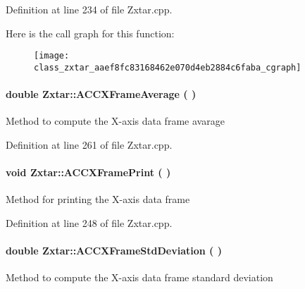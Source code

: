\begin{appendices}
\-Definition at line 234 of file \-Zxtar.\-cpp.



\-Here is the call graph for this function\-:\nopagebreak
\begin{figure}[H]
\begin{center}
\leavevmode
\texttt{[image: class\_zxtar\_aaef8fc83168462e070d4eb2884c6faba\_cgraph]}
\end{center}
\end{figure}


\paragraph[{\-A\-C\-C\-X\-Frame\-Average}]{\setlength{\rightskip}{0pt plus 5cm}double {\bf \-Zxtar\-::\-A\-C\-C\-X\-Frame\-Average} (
)}\label{class_zxtar_a8623ff9e740e0d6068f8b85ba2499a24}
\-Method to compute the \-X-\/axis data frame avarage 

\-Definition at line 261 of file \-Zxtar.\-cpp.

\paragraph[{\-A\-C\-C\-X\-Frame\-Print}]{\setlength{\rightskip}{0pt plus 5cm}void {\bf \-Zxtar\-::\-A\-C\-C\-X\-Frame\-Print} (
)}\label{class_zxtar_ac91d12d80e2b50ca915f83395890a420}
\-Method for printing the \-X-\/axis data frame 

\-Definition at line 248 of file \-Zxtar.\-cpp.

\paragraph[{\-A\-C\-C\-X\-Frame\-Std\-Deviation}]{\setlength{\rightskip}{0pt plus 5cm}double {\bf \-Zxtar\-::\-A\-C\-C\-X\-Frame\-Std\-Deviation} (
)}\label{class_zxtar_abc19d82ccb30e8cb23e017fb0c9f028b}
\-Method to compute the \-X-\/axis data frame standard deviation 


\end{appendices}

